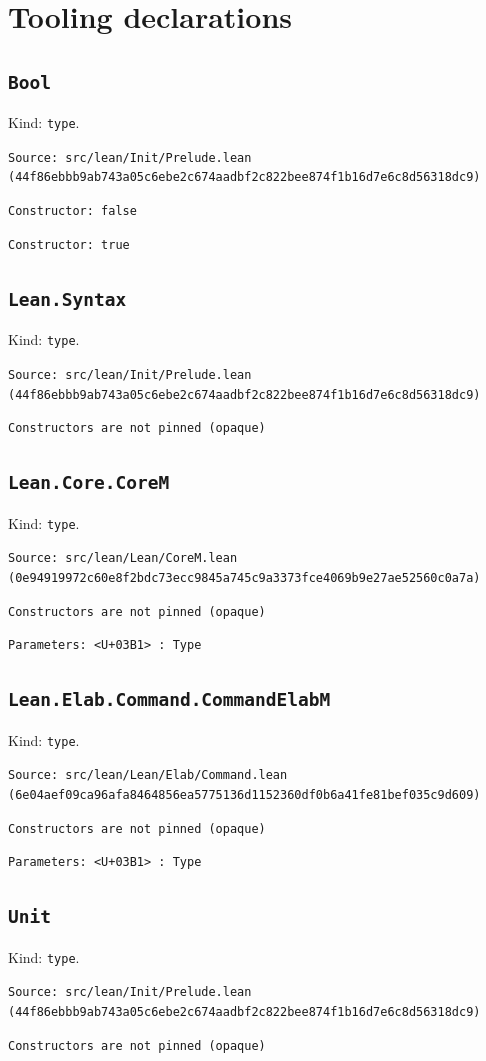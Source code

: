 \documentclass[11pt]{article}
\begin{document}
\section*{Tooling declarations}
\subsection*{\texttt{Bool}}
\noindent Kind: \texttt{type}.\par
\noindent \texttt{Source: src/lean/Init/Prelude.lean (44f86ebbb9ab743a05c6ebe2c674aadbf2c822bee874f1b16d7e6c8d56318dc9)}\par
\noindent \texttt{Constructor: false }\par
\noindent \texttt{Constructor: true }\par
\subsection*{\texttt{Lean.Syntax}}
\noindent Kind: \texttt{type}.\par
\noindent \texttt{Source: src/lean/Init/Prelude.lean (44f86ebbb9ab743a05c6ebe2c674aadbf2c822bee874f1b16d7e6c8d56318dc9)}\par
\noindent \texttt{Constructors are not pinned (opaque)}\par
\subsection*{\texttt{Lean.Core.CoreM}}
\noindent Kind: \texttt{type}.\par
\noindent \texttt{Source: src/lean/Lean/CoreM.lean (0e94919972c60e8f2bdc73ecc9845a745c9a3373fce4069b9e27ae52560c0a7a)}\par
\noindent \texttt{Constructors are not pinned (opaque)}\par
\noindent \texttt{Parameters: <U+03B1> : Type}\par
\subsection*{\texttt{Lean.Elab.Command.CommandElabM}}
\noindent Kind: \texttt{type}.\par
\noindent \texttt{Source: src/lean/Lean/Elab/Command.lean (6e04aef09ca96afa8464856ea5775136d1152360df0b6a41fe81bef035c9d609)}\par
\noindent \texttt{Constructors are not pinned (opaque)}\par
\noindent \texttt{Parameters: <U+03B1> : Type}\par
\subsection*{\texttt{Unit}}
\noindent Kind: \texttt{type}.\par
\noindent \texttt{Source: src/lean/Init/Prelude.lean (44f86ebbb9ab743a05c6ebe2c674aadbf2c822bee874f1b16d7e6c8d56318dc9)}\par
\noindent \texttt{Constructors are not pinned (opaque)}\par
\end{document}
